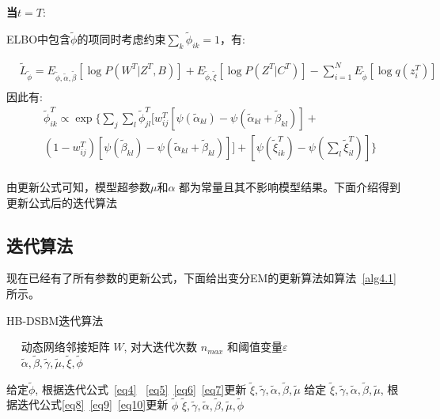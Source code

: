 \textbf{当$t=T$}:

ELBO中包含$\widetilde{\phi}$的项同时考虑约束$\sum_k \widetilde{\phi}_{ik} = 1 $，有:

\begin{equation}
\begin{split}
& \widetilde{L}_{\widetilde{\phi}} = E_{\widetilde{\phi},\widetilde{\alpha},\widetilde{\beta}} [\log P(W^T|Z^T,B)]+E_{\widetilde{\phi},\widetilde{\xi}} [\log P(Z^T|C^T)]
- \sum_{i=1}^N E_{\widetilde{\phi}}[\log q(z_i^T)]\\
\end{split}
\end{equation}
因此有:
\begin{equation}
\label{eq10}
\begin{split}
&\widetilde{\phi}_{ik}^T \propto \exp \{ \sum_j \sum_l \widetilde{\phi}_{jl}^T [w_{ij}^T[\psi(\widetilde{\alpha}_{kl}) - \psi(\widetilde{\alpha}_{kl}+\widetilde{\beta}_{kl})] + \\
&(1-w_{ij}^T)[\psi(\widetilde{\beta}_{kl})-\psi(\widetilde{\alpha}_{kl}+\widetilde{\beta}_{kl})]]  + [\psi(\widetilde{\xi}_{ik}^T) - \psi(\sum_l \widetilde{\xi}_{il}^T)]\}  \\
\end{split}
\end{equation} 

由更新公式可知，模型超参数$\mu$和$\alpha$ 都为常量且其不影响模型结果。下面介绍得到更新公式后的迭代算法

\subsection{迭代算法}

现在已经有了所有参数的更新公式，下面给出变分EM的更新算法如算法~\ref{alg4.1}所示。

\begin{algorithm}
	\caption{HB-DSBM迭代算法}\label{alg4.1}
	\algorithmicrequire ~~ 动态网络邻接矩阵 $W$, 对大迭代次数 $n_{max}$ 和阈值变量$\varepsilon$ \\
	\algorithmicensure ~~ $\widetilde{\alpha},\widetilde{\beta},\widetilde{\gamma},\widetilde{\mu},\widetilde{\xi},\widetilde{\phi}$
	\begin{algorithmic}[1]
		\REPEAT
		\STATE 给定$\widetilde{\phi}$, 根据迭代公式~\ref{eq4}
		~\ref{eq5}~\ref{eq6}~\ref{eq7}更新 $\widetilde{\xi},\widetilde{\gamma},\widetilde{\alpha},\widetilde{\beta},\widetilde{\mu}$
		\STATE 给定 $\widetilde{\xi},\widetilde{\gamma},\widetilde{\alpha},\widetilde{\beta},\widetilde{\mu}$, 根据迭代公式\ref{eq8}~\ref{eq9}~\ref{eq10}更新 $\widetilde{\phi}$ 
		\RETURN $\widetilde{\xi},\widetilde{\gamma},\widetilde{\alpha},\widetilde{\beta},\widetilde{\mu},\widetilde{\phi}$
	\end{algorithmic}
\end{algorithm}


